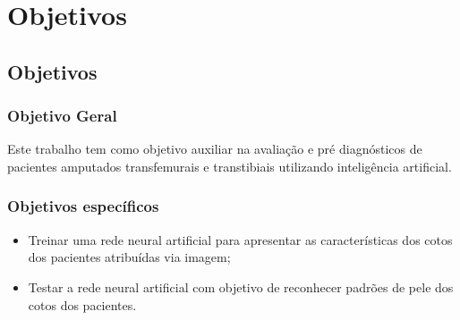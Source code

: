 \part{Objetivos}
\chapter[Objetivos]{Objetivos}

\section{Objetivo Geral}
    Este trabalho tem como objetivo auxiliar na avaliação e pré diagnósticos de pacientes amputados transfemurais e transtibiais utilizando inteligência artificial.


\section{Objetivos específicos}
    \begin{itemize}
        \item Treinar uma rede neural artificial para apresentar as características dos cotos dos pacientes atribuídas via imagem;
        \item Testar a rede neural artificial com objetivo de reconhecer padrões de pele dos cotos dos pacientes.
    \end{itemize}